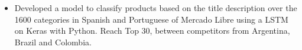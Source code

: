 \documentclass[10pt,a4paper,ragged2e]{altacv}
\begin{document}
\divider

\begin{itemize}
\item  Developed a model to classify products based on the title description over the 1600 categories in Spanish and Portuguese of Mercado Libre using a LSTM on Keras with Python.
Reach Top 30,  between competitors from Argentina, Brazil and Colombia. 

\end{itemize}

\divider








%


\end{document}
